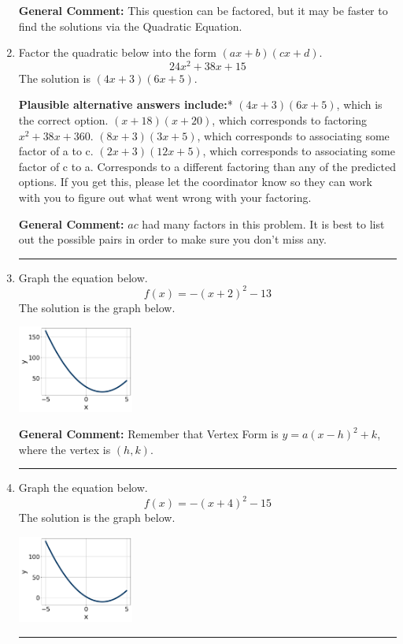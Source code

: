 \documentclass{extbook}[14pt]
\newcommand{\litem}[1]{\item #1

\rule{\textwidth}{0.4pt}}
\begin{document}
\begin{enumerate}
{\textbf{General Comment:} This question can be factored, but it may be faster to find the solutions via the Quadratic Equation.
}
\litem{
Factor the quadratic below into the form $(ax+b)(cx+d)$.
\[ 24x^{2} +38 x + 15 \]The solution is \( (4x + 3)(6x + 5) \).\begin{enumerate}[label=\Alph*.]
\textbf{Plausible alternative answers include:}* $(4x + 3)(6x + 5)$, which is the correct option.
 $(x + 18)(x + 20)$, which corresponds to factoring $x^{2} +38 x + 360$.
 $(8x + 3)(3x + 5)$, which corresponds to associating some factor of a to c.
 $(2x + 3)(12x + 5)$, which corresponds to associating some factor of c to a.
 Corresponds to a different factoring than any of the predicted options. If you get this, please let the coordinator know so they can work with you to figure out what went wrong with your factoring.
\end{enumerate}

\textbf{General Comment:} $ac$ had many factors in this problem. It is best to list out the possible pairs in order to make sure you don't miss any.
}
\litem{
Graph the equation below.
\[ f(x) = -(x+2)^2 - 13 \]The solution is the graph below.
    \begin{center}
        \includegraphics[width=0.3\textwidth]{../Figures/quadraticEquationToGraphCopyCB.png}
    \end{center}

\textbf{General Comment:} Remember that Vertex Form is $y = a(x-h)^2+k$, where the vertex is $(h, k)$.
}
\litem{
Graph the equation below.
\[ f(x) = -(x+4)^2 - 15 \]The solution is the graph below.
    \begin{center}
        \includegraphics[width=0.3\textwidth]{../Figures/quadraticEquationToGraphDB.png}
    \end{center}

}
\end{enumerate}
\end{document}
